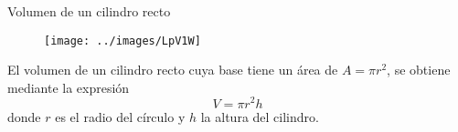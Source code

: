 
\begin{infocard}{Volumen de un cilindro recto}
    \begin{figure}[H]
        \centering
        \texttt{[image: ../images/LpV1W]}
    \end{figure}
    El volumen de un cilindro recto cuya base tiene un área de $A=\pi r^2$, se obtiene mediante la expresión
    \[  V = \pi r^2h  \]
    donde $r$ es el radio del círculo y $h$ la altura del cilindro.
\end{infocard}



